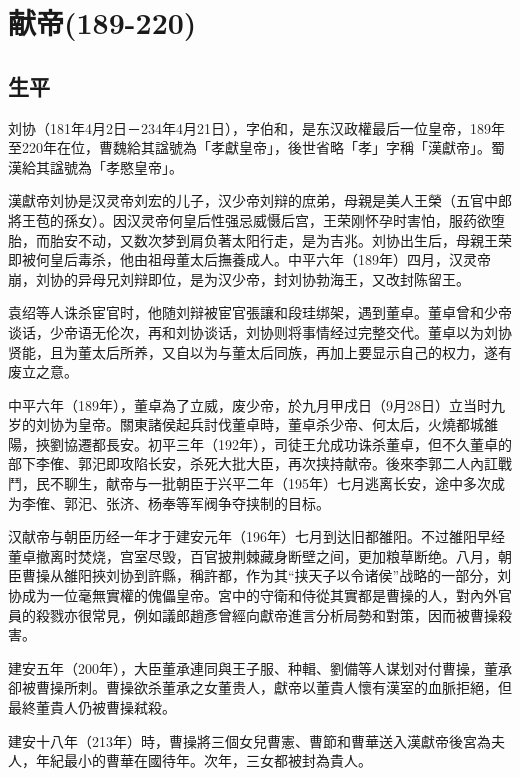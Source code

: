 
\section{献帝\tiny(189-220)}

\subsection{生平}

刘协（181年4月2日－234年4月21日），字伯和，是东汉政權最后一位皇帝，189年至220年在位，曹魏給其諡號為「孝獻皇帝」，後世省略「孝」字稱「漢獻帝」。蜀漢給其諡號為「孝愍皇帝」。

漢獻帝刘协是汉灵帝刘宏的儿子，汉少帝刘辩的庶弟，母親是美人王榮（五官中郎將王苞的孫女）。因汉灵帝何皇后性强忌威慑后宫，王荣刚怀孕时害怕，服药欲堕胎，而胎安不动，又数次梦到肩负著太阳行走，是为吉兆。刘协出生后，母親王荣即被何皇后毒杀，他由祖母董太后撫養成人。中平六年（189年）四月，汉灵帝崩，刘协的异母兄刘辩即位，是为汉少帝，封刘协勃海王，又改封陈留王。

袁绍等人诛杀宦官时，他随刘辩被宦官張讓和段珪绑架，遇到董卓。董卓曾和少帝谈话，少帝语无伦次，再和刘协谈话，刘协则将事情经过完整交代。董卓以为刘协贤能，且为董太后所养，又自以为与董太后同族，再加上要显示自己的权力，遂有废立之意。

中平六年（189年），董卓為了立威，废少帝，於九月甲戌日（9月28日）立当时九岁的刘协为皇帝。關東諸侯起兵討伐董卓時，董卓杀少帝、何太后，火燒都城雒陽，挾劉協遷都長安。初平三年（192年），司徒王允成功诛杀董卓，但不久董卓的部下李傕、郭汜即攻陷长安，杀死大批大臣，再次挟持献帝。後來李郭二人內訌戰鬥，民不聊生，献帝与一批朝臣于兴平二年（195年）七月逃离长安，途中多次成为李傕、郭汜、张济、杨奉等军阀争夺挟制的目标。

汉献帝与朝臣历经一年才于建安元年（196年）七月到达旧都雒阳。不过雒阳早经董卓撤离时焚烧，宫室尽毁，百官披荆棘藏身断壁之间，更加粮草断绝。八月，朝臣曹操从雒阳挾刘协到許縣，稱許都，作为其“挟天子以令诸侯”战略的一部分，刘协成为一位毫無實權的傀儡皇帝。宮中的守衛和侍從其實都是曹操的人，對內外官員的殺戮亦很常見，例如議郎趙彥曾經向獻帝進言分析局勢和對策，因而被曹操殺害。

建安五年（200年），大臣董承連同與王子服、种輯、劉備等人谋划对付曹操，董承卻被曹操所刺。曹操欲杀董承之女董贵人，獻帝以董貴人懷有漢室的血脈拒絕，但最終董貴人仍被曹操弒殺。

建安十八年（213年）時，曹操將三個女兒曹憲、曹節和曹華送入漢獻帝後宮為夫人，年紀最小的曹華在國待年。次年，三女都被封為貴人。

